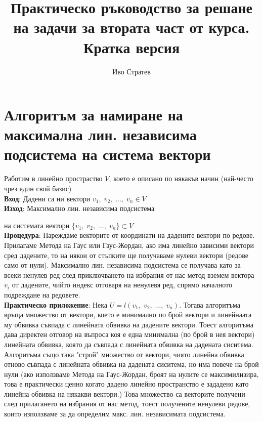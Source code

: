 \documentclass[12pt]{article}
\title{Практическо ръководство за решане на задачи за втората част от курса. Кратка версия}
\author{Иво Стратев}
\begin{document}
\maketitle

\section*{Алгоритъм за намиране на максимална лин. независима подсистема на система вектори}

Работим в линейно простраство $V$, което е описано по някакъв начин
(най-често чрез един свой базис) \\

\textbf{Вход}: Дадени са ни вектори $v_1, \; v_2, \; \dots, \; v_n \in V$ \\

\textbf{Изход}: Максимално лин. независима подсистема

на системата вектори $\{v_1, \; v_2, \; \dots, \; v_n\} \subset V$ \\

\textbf{Процедура}: Нареждаме векторите от координати на дадените вектори по редове.
Прилагаме Метода на Гаус или Гаус-Жордан, ако има линейно зависими вектори сред дадените,
то на някои от стъпките ще получаваме нулеви вектори (редове само от нули).
Максимално лин. независима подсистема се получава като за всеки ненулев ред след приключването
на избрания от нас метод вземем вектора $v_i$ от дадените, чийто индекс отговаря на ненулевя ред,
спрямо началното подреждане на редовете. \\

\textbf{Практическо приложение}: Нека $U = l(v_1, \; v_2, \; \dots, \; v_n)$.
Тогава алгоритъма връща множество от вектори, което е минимално по брой вектори и линейнаата му
обвивка съвпада с линейната обвивка на дадените вектори. Тоест алгоритъма дава директен отговор
на въпроса коя е една минимална (по брой в нея вектори) линейната обвивка,
която да съвпада с линейната обвивка на дадената сиситема. \\

Алгоритъма също така "строй" \; множество от вектори, чиято линейна обвивка отново съвпада с линейната обвивка
на дадената сиситема, но има повече на брой нули (ако използваме Метода на Гаус-Жордан, броят на нулите се
максимилизира, това е практически ценно когато дадено линейно пространство е зададено
като линейна обвивка на някакви вектори.) Това множество са векторите получени след прилагането на
избрания от нас метод, тоест получените ненулеви редове, които използваме за да определим
макс. лин. независимата подсистема. \\
\end{document}
